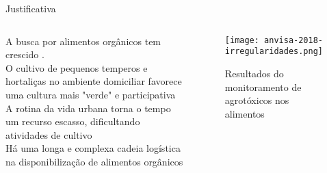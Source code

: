 \begin{frame}[t]{Justificativa} 
    \transdissolve[duration=0.5]
    \newcommand\vertspacejust{0.12cm}
        \begin{columns}[t]
                    \justifying
                    A busca por alimentos orgânicos tem crescido  \cite{sebrae:organicos} \cite{PesquisaOrganicos:online}. \\ \vspace*{\vertspacejust}
                    O cultivo de pequenos temperos e hortaliças no ambiente domiciliar favorece uma cultura mais "verde" e participativa \cite{G1:pequenoagricultor} \\ \vspace*{\vertspacejust}
                    A rotina da vida urbana torna o tempo um recurso escasso, dificultando atividades de cultivo \cite{G1:3xtransito} \\ \vspace*{\vertspacejust}
                    Há uma longa e complexa cadeia logística na disponibilização de alimentos orgânicos \cite{silva:cadeiaprodutiva}  \\ \vspace*{\vertspacejust}
            
            \begin{center}
                \begin{figure}
                    \vspace{-1cm}
                    \texttt{[image: anvisa-2018-irregularidades.png]}
                    \caption{\centering Resultados do monitoramento de agrotóxicos nos alimentos \cite{ANVISA-PARA:online}}
                \end{figure}
            \end{center}
        \end{columns}
\end{frame}


